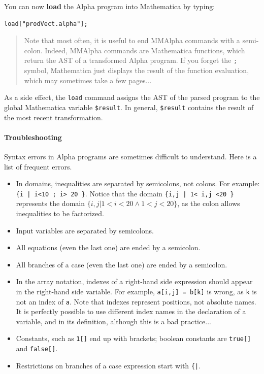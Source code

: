 \documentclass[12pt]{article}
\newcommand{\Alpha}{{\sc Alpha}}
\newcommand{\MMA}{{\sc MMAlpha}}
\newcommand{\alfa}{\Alpha}
\newcommand{\mmalfa}{\MMA}
\newcommand{\mma}{{Mathematica}}
\begin{document}
You can now {\bf load} the {\Alpha} program into \mma{}
by typing:\\
\begin{verbatim}
load["prodVect.alpha"];
\end{verbatim}
\begin{small}
\begin{quotation}
Note that most often, it is useful to end 
\mmalfa{} commands with a semi-colon.
Indeed, \mmalfa{} commands are \mma{} functions, 
which return the AST of a transformed \alfa{} program.
If you forget the {\tt ;} symbol, 
\mma{} just displays the result of the function evaluation, 
which may sometimes take a few pages... 
\end{quotation}
\end{small}

As a side effect, the \texttt{load} command assigns the AST of
the parsed program to 
the global \mma{} variable {\tt \$result}. 
In general, 
\texttt{\$result} contains the result of the most recent transformation.

\paragraph*{Troubleshooting}
Syntax errors in \alfa{} programs are sometimes difficult to understand. Here is 
a list of frequent errors.
\begin{itemize}
\item In domains, inequalities are separated by semicolons, not
colons. For example: \texttt{\{i | i<10 ; i> 20 \}}. Notice
that the domain \texttt{\{i,j | 1< i,j <20 \}}
represents the domain $\{i,j | 1 < i < 20 \wedge 
1 < j < 20 \}$, as the colon allows inequalities to 
be factorized.
\item Input variables are separated by semicolons.
\item All equations (even the last one) are ended by a semicolon.
\item All branches of a case (even the last one) are ended by a semicolon.
\item In the array notation, 
indexes of a right-hand side expression should appear in 
the right-hand side variable. For
example, \texttt{a[i,j] = b[k]} is wrong, as \texttt{k} is
not an index of \texttt{a}. Note that indexes represent 
positions, not absolute names. It is perfectly possible 
to use different index names in the declaration of a
variable, and in its definition, although this is a
bad practice...
\item Constants, such as \texttt{1[]} end up with brackets; boolean
constants are \texttt{true[]} and \texttt{false[]}.
\item Restrictions on branches of a case expression start with
\texttt{\{|}. 
\end{itemize}
\end{document}
